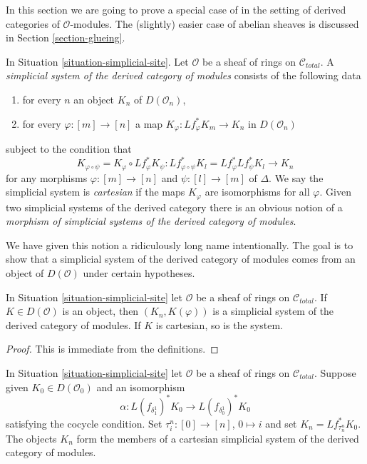 \noindent
In this section we are going to prove a special case of
\cite[Proposition 3.2.9]{BBD} in the setting of derived
categories of $\mathcal{O}$-modules. The (slightly) easier
case of abelian sheaves is discussed in Section \ref{section-glueing}.

\begin{definition}
\label{definition-cartesian-derived-modules}
In Situation \ref{situation-simplicial-site}. Let $\mathcal{O}$
be a sheaf of rings on $\mathcal{C}_{total}$. A
{\it simplicial system of the derived category of modules}
consists of the following data
\begin{enumerate}
\item for every $n$ an object $K_n$ of $D(\mathcal{O}_n)$,
\item for every $\varphi : [m] \to [n]$ a map
$K_\varphi : Lf_\varphi^*K_m \to K_n$ in $D(\mathcal{O}_n)$
\end{enumerate}
subject to the condition that
$$
K_{\varphi \circ \psi} = K_\varphi \circ Lf_\varphi^*K_\psi :
Lf_{\varphi \circ \psi}^*K_l = Lf_\varphi^* Lf_\psi^*K_l
\longrightarrow
K_n
$$
for any morphisms $\varphi : [m] \to [n]$ and $\psi : [l] \to [m]$ of $\Delta$.
We say the simplicial system is {\it cartesian} if the maps $K_\varphi$
are isomorphisms for all $\varphi$.
Given two simplicial systems of the derived category
there is an obvious notion of a
{\it morphism of simplicial systems of the derived category of modules}.
\end{definition}

\noindent
We have given this notion a ridiculously long name intentionally.
The goal is to show that a simplicial system of the derived category
of modules comes from an object of $D(\mathcal{O})$ under certain
hypotheses.

\begin{lemma}
\label{lemma-cartesian-objects-derived-modules}
In Situation \ref{situation-simplicial-site} let $\mathcal{O}$ be a
sheaf of rings on $\mathcal{C}_{total}$.
If $K \in D(\mathcal{O})$ is an object, then $(K_n, K(\varphi))$
is a simplicial system of the derived category of modules.
If $K$ is cartesian, so is the system.
\end{lemma}

\begin{proof}
This is immediate from the definitions.
\end{proof}

\begin{lemma}
\label{lemma-construct-cartesian-objects-derived-modules}
In Situation \ref{situation-simplicial-site} let $\mathcal{O}$ be a
sheaf of rings on $\mathcal{C}_{total}$.
Suppose given $K_0 \in D(\mathcal{O}_0)$ and an isomorphism
$$
\alpha :
L(f_{\delta_1^1})^*K_0
\longrightarrow
L(f_{\delta_0^1})^*K_0
$$
satisfying the cocycle condition. Set $\tau^n_i : [0] \to [n]$, $0 \mapsto i$
and set $K_n = Lf_{\tau^n_n}^*K_0$. The objects $K_n$ form the members of a 
cartesian simplicial system of the derived category of modules.
\end{lemma}

